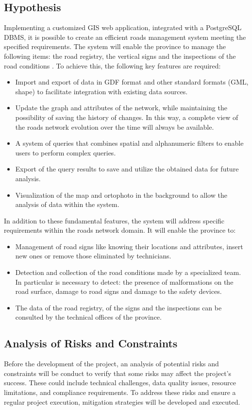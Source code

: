 \subsection{Hypothesis}
Implementing a customized GIS web application, integrated with a PostgreSQL DBMS, it is possible to create an efficient roads management system meeting the specified requirements. The system will enable the province to manage the following items: the road registry, the vertical signs and the inspections of the road conditions . To achieve this, the following key features are required:
\begin{itemize}
\item Import and export of data in GDF format and other standard formats (GML, shape) to facilitate integration with existing data sources.
\item Update the graph and attributes of the network, while maintaining the possibility of saving the history of changes. In this way, a complete view of the roads network evolution over the time will always be available.
\item A system of queries that combines spatial and alphanumeric filters to enable users to perform complex queries.
\item Export of the query results to save and utilize the obtained data for future analysis.
\item Visualization of the map and ortophoto in the background to allow the analysis of data within the system.
\end{itemize}
In addition to these fundamental features, the system will address specific requirements within the roads network domain. It will enable the province to:
\begin{itemize}
\item Management of road signs like knowing their locations and attributes, insert new ones or remove those eliminated by technicians.
\item Detection and collection of the road conditions made by a specialized team. In particular is necessary to detect: the presence of malformations on the road surface, damage to road signs and damage to the safety devices.
\item The data of the road registry, of the signs and the inspections can be consulted by the technical offices of the province.
\end{itemize}
\subsection{Analysis of Risks and Constraints}
Before the development of the project, an analysis of potential risks and constraints will be conduct to verify that some risks  may affect the project’s success. These could include technical challenges, data quality issues, resource limitations, and compliance requirements. To address these risks and ensure a regular project execution, mitigation strategies will be developed and executed.